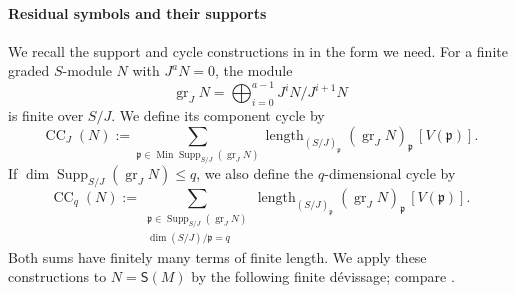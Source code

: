 \documentclass[11pt]{article}
\theoremstyle{definition}
\newcommand{\gr}{\operatorname{gr}}
\newcommand{\CC}{\operatorname{CC}}
\newcommand{\Supp}{\operatorname{Supp}}
\newcommand{\Min}{\operatorname{Min}}
\newcommand{\length}{\operatorname{length}}
\begin{document}
\paragraph{Residual symbols and their supports}
\label{sec:definitions}
We recall the support and cycle constructions in
\cite[Tags~02QW, 02QX and 02QZ]{Stacks} in the form we need.
For a finite graded $S$-module $N$ with $J^aN=0$, the module
\[
 \gr_JN=\bigoplus_{i=0}^{a-1}J^iN/J^{i+1}N
\]
is finite over $S/J$. We define its component cycle by
\begin{equation}\label{eq:component-cycle}
 \CC_J(N):=\sum_{\mathfrak p\in\Min\Supp_{S/J}(\gr_JN)}
 \length_{(S/J)_{\mathfrak p}}(\gr_JN)_{\mathfrak p}
 \, [V(\mathfrak p)].
\end{equation}
If $\dim\Supp_{S/J}(\gr_JN)\leq q$, we also define the $q$-dimensional cycle by
\begin{equation}\label{eq:q-cycle}
 \CC_q(N):=\sum_{\substack{\mathfrak p\in\Supp_{S/J}(\gr_JN)\\
                 \dim (S/J)/\mathfrak p=q}}
 \length_{(S/J)_{\mathfrak p}}(\gr_JN)_{\mathfrak p}
 \, [V(\mathfrak p)].
\end{equation}
Both sums have finitely many terms of finite length. We apply these
constructions to $N=\mathsf S(M)$ by the following finite d\'evissage;
compare \cite[Lemma~D.3.3]{HTT2008}.
\end{document}

